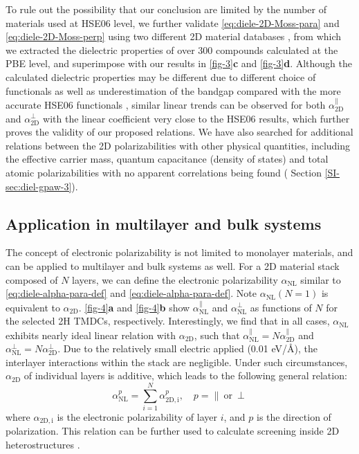 To rule out the possibility that our conclusion are limited by the
number of materials used at HSE06 level, we further validate
 \autoref{eq:diele-2D-Moss-para} and \autoref{eq:diele-2D-Moss-perp} using two
different 2D material databases \cite{Haastrup_2018_database,Mounet_2018_database}, from
which we extracted the dielectric properties of over 300 compounds
calculated at the PBE level, and superimpose with our results in
 \autoref{fig-3}{\textbf c} and \autoref{fig-3}{\textbf d}. Although the
calculated dielectric properties may be different due to different
choice of functionals as well as underestimation of the bandgap
compared with the more accurate HSE06 functionals
\cite{Van_Dyck_2017}, similar linear trends can be observed for both
$\alpha^{\parallel}_{\mathrm{2D}}$ and $\alpha_{\mathrm{2D}}^{\perp}$
with the linear coefficient very close to the HSE06 results, which
further proves the validity of our proposed relations. We have also
searched for additional relations between the 2D polarizabilities with
other physical quantities, including the effective carrier mass,
quantum capacitance (density of states) and total atomic
polarizabilities with no apparent correlations being found
( Section \autoref{SI-sec:diel-gpaw-3}).

\subsection{Application in multilayer and bulk systems}
\label{sec:diel-apply-electr-polar}
The concept of electronic polarizability is not limited to monolayer
materials, and can be applied to multilayer and bulk systems as
well. For a 2D material stack composed of $N$ layers, we can define
the electronic polarizability $\alpha_{\mathrm{NL}}$ similar to
 \eqref{eq:diele-alpha-para-def} and \eqref{eq:diele-alpha-para-def}. Note
$\alpha_{\mathrm{NL}}(N=1)$ is equivalent to $\alpha_{\mathrm{2D}}$.
 \autoref{fig-4}\textbf{a} and \autoref{fig-4}\textbf{b} show
$\alpha_{\mathrm{NL}}^{\parallel}$ and $\alpha_{\mathrm{NL}}^{\perp}$
as functions of $N$ for the selected 2H TMDCs,
respectively. Interestingly, we find that in all cases,
$\alpha_{\mathrm{NL}}$ exhibits nearly ideal linear relation with
$\alpha_{\mathrm{2D}}$, such that
$\alpha_{\mathrm{NL}}^{\parallel}= N \alpha_{\mathrm{2D}}^{\parallel}$
and $\alpha_{\mathrm{NL}}^{\perp}= N
\alpha_{\mathrm{2D}}^{\perp}$. Due to the relatively small
electric applied (0.01 eV/\AA{}), the interlayer interactions within
the stack are negligible. Under such circumstances, $\alpha_{\mathrm{2D}}$ of individual layers is additive, which leads to the following general relation:
\begin{equation}
  \label{eq:diele-alpha-nl}
  \alpha_{\mathrm{NL}}^{p} = \sum_{i=1}^{N} \alpha_{\mathrm{2D, i}}^{p},\quad p=\parallel\ \mathrm{or}\ \perp
\end{equation}
where $\alpha_{\mathrm{2D, i}}$ is the electronic polarizability of
layer $i$, and $p$ is the direction of polarization. This relation can
be further used to calculate screening inside 2D heterostructures
\cite{Kumar_2016_jpcc,Andersen_2015_dielec_vdWH}.
%
%
%

